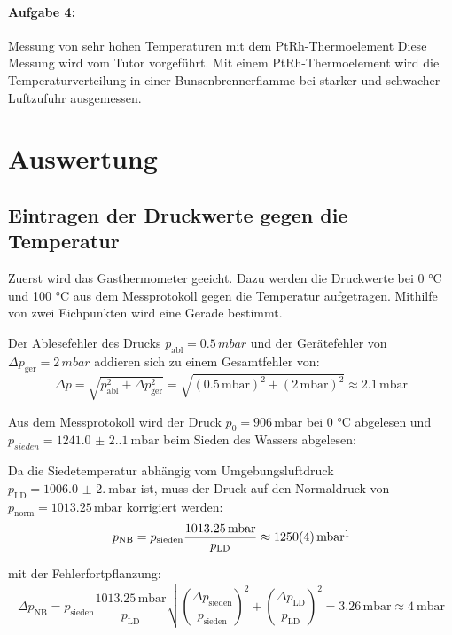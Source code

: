 \documentclass[12pt,a4paper,titlepage]{scrartcl}
\numberwithin{equation}{section}
\numberwithin{table}{section}
\numberwithin{figure}{section}
\begin{document}
\paragraph{Aufgabe 4:} Messung von sehr hohen Temperaturen mit dem PtRh-Thermoelement
Diese Messung wird vom Tutor vorgeführt. Mit einem PtRh-Thermoelement wird die Temperaturverteilung in einer Bunsenbrennerflamme bei starker und schwacher Luftzufuhr ausgemessen.


\section{Auswertung}
\subsection{Eintragen der Druckwerte gegen die Temperatur}
Zuerst wird das Gasthermometer geeicht. Dazu werden die Druckwerte bei 0 °C und 100 °C aus dem Messprotokoll gegen die Temperatur aufgetragen. Mithilfe von zwei Eichpunkten wird eine Gerade bestimmt.

Der Ablesefehler des Drucks $p_\text{abl} = 0.5\, mbar$ und der Gerätefehler von $\Delta p_\text{ger} = 2\, mbar$ addieren sich zu einem Gesamtfehler von:
\begin{equation}
    \Delta p = \sqrt{p_\text{abl}^2 + \Delta p_\text{ger}^2} = \sqrt{(0.5\,\text{mbar})^2 + (2\,\text{mbar})^2} \approx 2.1\,\text{mbar}
    \label{eq:druckfehler}
\end{equation}

Aus dem Messprotokoll wird der Druck $p_0 = 906\, \si{\milli\bar}$ bei 0 °C abgelesen und  $p_{sieden} = \qty{1241.0(2.1)}{\milli\bar}$ beim Sieden des Wassers abgelesen:

Da die Siedetemperatur abhängig vom Umgebungsluftdruck $p_\text{LD} = \qty{1006.0(2.0)}{\milli\bar}$ ist, muss der Druck auf den Normaldruck von $p_\text{norm} = 1013.25\,\si{\milli\bar}$ korrigiert werden:
\begin{equation}
    p_\text{NB} = p_\text{sieden} \frac{1013.25\,\si{\milli\bar}}{p_\text{LD}} \approx \qty{1250(4)}{\milli\bar}\footnotemark
\end{equation}

mit der Fehlerfortpflanzung:
\begin{equation}
    \Delta p_\text{NB} = p_\text{sieden} \frac{1013.25\,\si{\milli\bar}}{p_\text{LD}} \sqrt{\left(\frac{\Delta p_\text{sieden}}{p_\text{sieden}}\right)^2 + \left(\frac{\Delta p_\text{LD}}{p_\text{LD}}\right)^2} = 3.26\,\si{\milli\bar} \approx \qty{4}{\milli\bar}
\end{equation}
\end{document}
